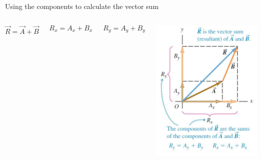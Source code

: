 \documentclass[]{beamer}
\begin{document}
\begin{frame}




 Using the components to calculate the vector sum







\begin{columns}


\begin{equation*}
\vec{R}=\vec{A}+\vec{B}
\end{equation*}

\begin{equation*}
R_x =A_x+B_x
\end{equation*}

\begin{equation*}
R_y =A_y+B_y
\end{equation*}




\begin{center}
     \includegraphics[width=1.\textwidth]{images/vector_sum.jpg}      
     \end{center}


\end{columns}




 \end{frame}
\end{document}
